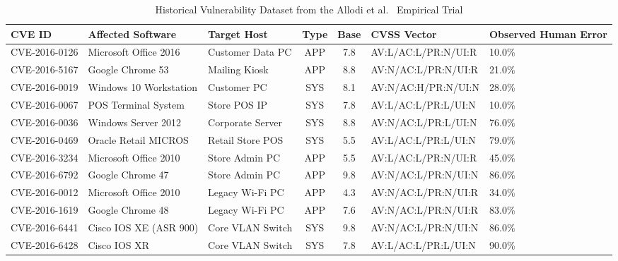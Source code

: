 \begin{landscape}
\begin{table}[p]
\centering\scriptsize
\caption{Historical Vulnerability Dataset from the Allodi et al.~\cite{santos2017estimating} Empirical Trial}
\label{tab:app_historical_cves}
\begin{adjustbox}{max width=\linewidth}
\begin{tabular}{lp{3.5cm}p{2.8cm}ccp{3.7cm}p{2.6cm}}
\toprule
\textbf{CVE ID} & \textbf{Affected Software} & \textbf{Target Host} & \textbf{Type} & \textbf{Base} & \textbf{CVSS Vector} & \textbf{Observed Human Error} \\
\midrule
CVE-2016-0126 & Microsoft Office 2016 & Customer Data PC & APP & 7.8 & AV:L/\allowbreak AC:L/\allowbreak PR:N/\allowbreak UI:R & 10.0\% \\
CVE-2016-5167 & Google Chrome 53      & Mailing Kiosk    & APP & 8.8 & AV:N/\allowbreak AC:L/\allowbreak PR:N/\allowbreak UI:R & 21.0\% \\
CVE-2016-0019 & Windows 10 Workstation& Customer PC      & SYS & 8.1 & AV:N/\allowbreak AC:H/\allowbreak PR:N/\allowbreak UI:N & 28.0\% \\
CVE-2016-0067 & POS Terminal System   & Store POS IP     & SYS & 7.8 & AV:L/\allowbreak AC:L/\allowbreak PR:L/\allowbreak UI:N & 10.0\% \\
CVE-2016-0036 & Windows Server 2012   & Corporate Server & SYS & 8.8 & AV:N/\allowbreak AC:L/\allowbreak PR:L/\allowbreak UI:N & 76.0\% \\
CVE-2016-0469 & Oracle Retail MICROS  & Retail Store POS & SYS & 5.5 & AV:L/\allowbreak AC:L/\allowbreak PR:L/\allowbreak UI:N & 79.0\% \\
CVE-2016-3234 & Microsoft Office 2010 & Store Admin PC   & APP & 5.5 & AV:L/\allowbreak AC:L/\allowbreak PR:N/\allowbreak UI:R & 45.0\% \\
CVE-2016-6792 & Google Chrome 47      & Store Admin PC   & APP & 9.8 & AV:N/\allowbreak AC:L/\allowbreak PR:N/\allowbreak UI:N & 86.0\% \\
CVE-2016-0012 & Microsoft Office 2010 & Legacy Wi-Fi PC  & APP & 4.3 & AV:N/\allowbreak AC:L/\allowbreak PR:N/\allowbreak UI:R & 34.0\% \\
CVE-2016-1619 & Google Chrome 48      & Legacy Wi-Fi PC  & APP & 7.6 & AV:N/\allowbreak AC:L/\allowbreak PR:N/\allowbreak UI:R & 83.0\% \\
CVE-2016-6441 & Cisco IOS XE (ASR 900)& Core VLAN Switch & SYS & 9.8 & AV:N/\allowbreak AC:L/\allowbreak PR:N/\allowbreak UI:N & 86.0\% \\
CVE-2016-6428 & Cisco IOS XR          & Core VLAN Switch & SYS & 7.8 & AV:L/\allowbreak AC:L/\allowbreak PR:L/\allowbreak UI:N & 90.0\% \\
\bottomrule
\end{tabular}
\end{adjustbox}
\end{table}
\end{landscape}

